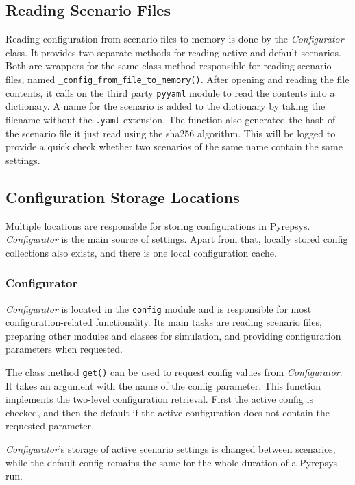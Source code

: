 \documentclass[%
    ]{\PathToTumTemplate/thesis/tum_thesis}
\begin{document}
\subsection{Reading Scenario Files}
Reading configuration from scenario files to memory is done by the \emph{Configurator} class.
It provides two separate methods for reading active and default scenarios.
Both are wrappers for the same class method responsible for reading scenario files, named \lstinline{_config_from_file_to_memory()}.
After opening and reading the file contents, it calls on the third party \texttt{pyyaml} module to read the contents into a dictionary.
A name for the scenario is added to the dictionary by taking the filename without the \texttt{.yaml} extension.
The function also generated the hash of the scenario file it just read using the sha256 algorithm.
This will be logged to provide a quick check whether two scenarios of the same name contain the same settings.

\subsection{Configuration Storage Locations}
Multiple locations are responsible for storing configurations in Pyrepsys.
\emph{Configurator} is the main source of settings.
Apart from that, locally stored config collections also exists, and there is one local configuration cache.

\subsubsection{Configurator}
\emph{Configurator} is located in the \texttt{config} module and is responsible for most configuration-related functionality.
Its main tasks are reading scenario files, preparing other modules and classes for simulation, and providing configuration parameters when requested.

The class method \lstinline{get()} can be used to request config values from \emph{Configurator}.
It takes an argument with the name of the config parameter.
This function implements the two-level configuration retrieval.
First the active config is checked, and then the default if the active configuration does not contain the requested parameter.

\emph{Configurator}'s storage of active scenario settings is changed between scenarios, while the default config remains the same for the whole duration of a Pyrepsys run.
\end{document}
